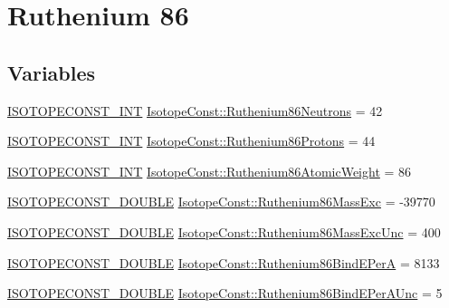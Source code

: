 \hypertarget{group___isotope_const-_ruthenium-_ru86}{}\section{Ruthenium 86}
\label{group___isotope_const-_ruthenium-_ru86}
\subsection*{Variables}
\begin{DoxyCompactItemize}
\item 
\mbox{\hyperlink{group___isotope_const-_macros_ga5f18360b3e99483a35c32d789e62621c}{I\+S\+O\+T\+O\+P\+E\+C\+O\+N\+S\+T\+\_\+\+I\+NT}} \mbox{\hyperlink{group___isotope_const-_ruthenium-_ru86_gaff6db94f3e180768a8f184afcc82abf9}{Isotope\+Const\+::\+Ruthenium86\+Neutrons}} = 42
\item 
\mbox{\hyperlink{group___isotope_const-_macros_ga5f18360b3e99483a35c32d789e62621c}{I\+S\+O\+T\+O\+P\+E\+C\+O\+N\+S\+T\+\_\+\+I\+NT}} \mbox{\hyperlink{group___isotope_const-_ruthenium-_ru86_gaf19157829de4b9919724176d65a5befc}{Isotope\+Const\+::\+Ruthenium86\+Protons}} = 44
\item 
\mbox{\hyperlink{group___isotope_const-_macros_ga5f18360b3e99483a35c32d789e62621c}{I\+S\+O\+T\+O\+P\+E\+C\+O\+N\+S\+T\+\_\+\+I\+NT}} \mbox{\hyperlink{group___isotope_const-_ruthenium-_ru86_ga99530d80409b9d5c0e87ca04028c5f70}{Isotope\+Const\+::\+Ruthenium86\+Atomic\+Weight}} = 86
\item 
\mbox{\hyperlink{group___isotope_const-_macros_ga8f45a7272ce02c0b4c65c44636ed719a}{I\+S\+O\+T\+O\+P\+E\+C\+O\+N\+S\+T\+\_\+\+D\+O\+U\+B\+LE}} \mbox{\hyperlink{group___isotope_const-_ruthenium-_ru86_gaababaf31013bdfb5a7ea2ca73758dd1d}{Isotope\+Const\+::\+Ruthenium86\+Mass\+Exc}} = -\/39770
\item 
\mbox{\hyperlink{group___isotope_const-_macros_ga8f45a7272ce02c0b4c65c44636ed719a}{I\+S\+O\+T\+O\+P\+E\+C\+O\+N\+S\+T\+\_\+\+D\+O\+U\+B\+LE}} \mbox{\hyperlink{group___isotope_const-_ruthenium-_ru86_ga72ba2f08cc16528613f7ef837f5b6de8}{Isotope\+Const\+::\+Ruthenium86\+Mass\+Exc\+Unc}} = 400
\item 
\mbox{\hyperlink{group___isotope_const-_macros_ga8f45a7272ce02c0b4c65c44636ed719a}{I\+S\+O\+T\+O\+P\+E\+C\+O\+N\+S\+T\+\_\+\+D\+O\+U\+B\+LE}} \mbox{\hyperlink{group___isotope_const-_ruthenium-_ru86_ga6ea3da18f6b676b28cee9928cfcbc213}{Isotope\+Const\+::\+Ruthenium86\+Bind\+E\+PerA}} = 8133
\item 
\mbox{\hyperlink{group___isotope_const-_macros_ga8f45a7272ce02c0b4c65c44636ed719a}{I\+S\+O\+T\+O\+P\+E\+C\+O\+N\+S\+T\+\_\+\+D\+O\+U\+B\+LE}} \mbox{\hyperlink{group___isotope_const-_ruthenium-_ru86_ga059bcff6141c19852ca82abf458f1d8e}{Isotope\+Const\+::\+Ruthenium86\+Bind\+E\+Per\+A\+Unc}} = 5

\end{DoxyCompactItemize}
